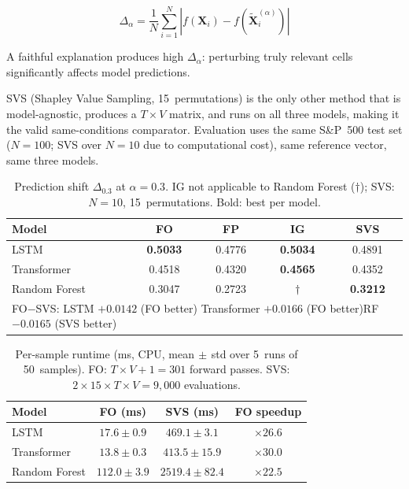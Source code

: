 \documentclass[runningheads]{llncs}
\begin{document}
\begin{equation}
    \Delta_\alpha = \frac{1}{N}\sum_{i=1}^{N}
        \left|f(\mathbf{X}_i) - f(\tilde{\mathbf{X}}_i^{(\alpha)})\right|
    \label{eq:faithfulness}
\end{equation}

A faithful explanation produces high $\Delta_\alpha$: perturbing
truly relevant cells significantly affects model predictions.

SVS (Shapley Value Sampling, 15~permutations) is the only other
method that is model-agnostic, produces a $T{\times}V$ matrix, and
runs on all three models, making it the valid same-conditions
comparator. Evaluation uses the same S\&P~500 test set ($N{=}100$;
SVS over $N{=}10$ due to computational cost), same reference vector,
same three models.

\begin{table}[ht]
\caption{Prediction shift $\Delta_{0.3}$ at $\alpha{=}0.3$.
         IG not applicable to Random Forest ($\dagger$);
         SVS: $N{=}10$, 15~permutations. Bold: best per model.}
\label{tab:faithfulness}
\centering
\begin{tabular}{lcccc}
\toprule
\textbf{Model} & \textbf{FO} & \textbf{FP}
               & \textbf{IG} & \textbf{SVS} \\
\midrule
LSTM          & \textbf{0.5033} & 0.4776 & \textbf{0.5034} & 0.4891 \\
Transformer   & 0.4518          & 0.4320 & \textbf{0.4565} & 0.4352 \\
Random Forest & 0.3047          & 0.2723 & $\dagger$        & \textbf{0.3212} \\
\midrule
\multicolumn{5}{l}{\small FO$-$SVS: LSTM $+0.0142$ (FO better)\quad
  Transformer $+0.0166$ (FO better)\quad RF $-0.0165$ (SVS better)} \\
\bottomrule
\end{tabular}
\end{table}

\begin{table}[ht]
\caption{Per-sample runtime (ms, CPU, mean$\,\pm\,$std over 5~runs of
         50~samples). FO: $T{\times}V{+}1{=}301$ forward passes.
         SVS: $2{\times}15{\times}T{\times}V{=}9{,}000$ evaluations.}
\label{tab:timing}
\centering
\begin{tabular}{lccc}
\toprule
\textbf{Model} & \textbf{FO (ms)} & \textbf{SVS (ms)}
               & \textbf{FO speedup} \\
\midrule
LSTM          & $17.6\pm0.9$   & $469.1\pm3.1$   & ${\times}26.6$ \\
Transformer   & $13.8\pm0.3$   & $413.5\pm15.9$  & ${\times}30.0$ \\
Random Forest & $112.0\pm3.9$  & $2519.4\pm82.4$ & ${\times}22.5$ \\
\bottomrule
\end{tabular}
\end{table}
\end{document}
